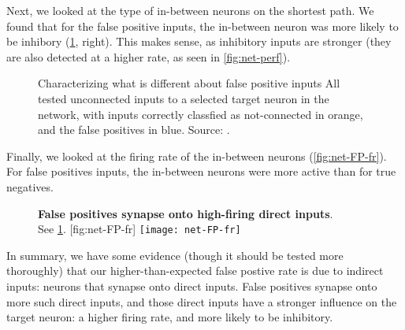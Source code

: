 Next, we looked at the type of in-between neurons on the shortest path. We found that for the false positive inputs, the in-between neuron was more likely to be inhibory (\cref{fig:net-FP}, right). This makes sense, as inhibitory inputs are stronger (they are also detected at a higher rate, as seen in \cref{fig:net-perf}).

\begin{figure}
    \captionn
        {Characterizing what is different about false positive inputs}
        {All tested unconnected inputs to a selected target neuron in the network, with inputs correctly classfied as not-connected in orange, and the false positives in blue. Source: .}
    \label{fig:net-FP}
\end{figure}


Finally, we looked at the firing rate of the in-between neurons (\cref{fig:net-FP-fr}). For false positives inputs, the in-between neurons were more active than for true negatives.


\begin{figure}
    \begin{sidecaption}
        {\textbf{False positives synapse onto high-firing direct inputs}.\\
        See \cref{fig:net-FP}.}
        [fig:net-FP-fr]
        \texttt{[image: net-FP-fr]}
    \end{sidecaption}
\end{figure}


In summary, we have some evidence (though it should be tested more thoroughly) that our higher-than-expected false postive rate is due to indirect inputs: neurons that synapse onto direct inputs. False positives synapse onto more such direct inputs, and those direct inputs have a stronger influence on the target neuron: a higher firing rate, and more likely to be inhibitory.
